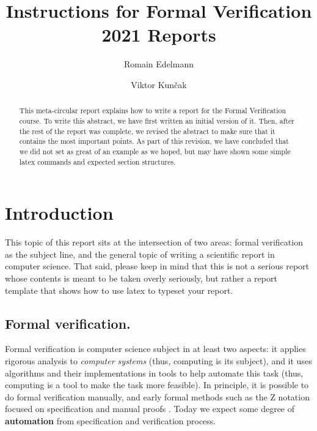 \documentclass[a4paper,UKenglish,cleveref, autoref, thm-restate]{lipics-v2021}
\title{Instructions for Formal Verification 2021 Reports} %
\author{Romain Edelmann}{EPFL}{romain.edelmann@epfl.ch}{}{}
\author{Viktor Kun\v{c}ak}{EPFL}{viktor.kuncak@epfl.ch}{https://orcid.org/0000-0001-7044-9522}{}
\begin{document}
\maketitle

\begin{abstract}
  This meta-circular report explains how to write a report
  for the Formal Verification course.  To write this
  abstract, we have first written an initial version of
  it. Then, after the rest of the report was complete, we
  revised the abstract to make sure that it contains the
  most important points. As part of this revision, we have
  concluded that we did not set as great of an example as we
  hoped, but may have shown some simple latex commands and
  expected section structures.
\end{abstract}

\lstset{language=scala}


\section{Introduction}
\label{sec:intro}

This topic of this report sits at the intersection of two
areas: formal verification as the subject line, and the
general topic of writing a scientific report in computer
science. That said, please keep in mind that this is not a
serious report whose contents is meant to be taken overly
seriously, but rather a report template that shows how to
use latex to typeset your report.

\subsection{Formal verification.}
Formal verification is computer science subject in at least
two aspects: it applies rigorous analysis to
\emph{computer systems} %
(thus, computing is its subject), and it uses
algorithms and their implementations in tools to help
automate this task (thus, computing is a tool to make the
task more feasible). In principle, it is possible to do
formal verification manually, and early formal methods such
as the Z notation focused on specification and manual proofs
\cite{DBLP:books/daglib/0072139}.
Today we expect some
degree of \textbf{automation} from specification and verification
process. %
\end{document}
